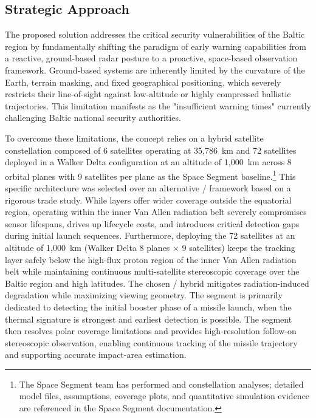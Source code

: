 \subsection{Strategic Approach}  
The proposed solution addresses the critical security vulnerabilities of the Baltic region by fundamentally shifting the paradigm of early warning capabilities from a reactive, ground-based radar posture to a proactive, space-based observation framework. Ground-based systems are inherently limited by the curvature of the Earth, terrain masking, and fixed geographical positioning, which severely restricts their line-of-sight against low-altitude or highly compressed ballistic trajectories. This limitation manifests as the "insufficient warning times" currently challenging Baltic national security authorities. 

To overcome these limitations, the concept relies on a hybrid satellite constellation composed of 6  satellites operating at 35,786~km and 72  satellites deployed in a Walker Delta configuration at an altitude of 1,000~km across 8 orbital planes with 9 satellites per plane as the Space Segment baseline.\footnote{The Space Segment team has performed  and  constellation analyses; detailed model files, assumptions, coverage plots, and quantitative simulation evidence are referenced in the Space Segment documentation.} This specific architecture was selected over an alternative / framework based on a rigorous trade study. While  layers offer wider coverage outside the equatorial region, operating within the inner Van Allen radiation belt severely compromises sensor lifespans, drives up lifecycle costs, and introduces critical detection gaps during initial launch sequences. Furthermore, deploying the 72  satellites at an altitude of 1,000~km (Walker Delta 8 planes $\times$ 9 satellites) keeps the tracking layer safely below the high-flux proton region of the inner Van Allen radiation belt while maintaining continuous multi-satellite stereoscopic coverage over the Baltic region and high latitudes. The chosen / hybrid mitigates radiation-induced degradation while maximizing viewing geometry. The  segment is primarily dedicated to detecting the initial booster phase of a missile launch, when the thermal signature is strongest and earliest detection is possible. The  segment then resolves polar coverage limitations and provides high-resolution follow-on stereoscopic observation, enabling continuous tracking of the missile trajectory and supporting accurate impact-area estimation. 

